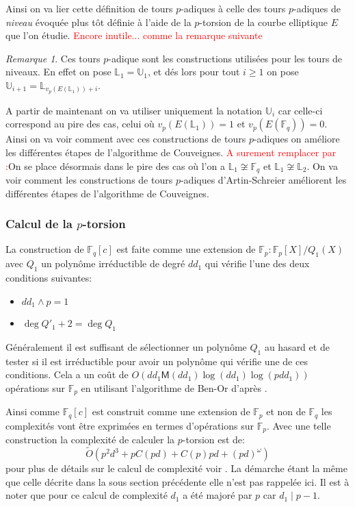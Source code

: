 \documentclass[10pt,a4paper]{book}
\theoremstyle{plain}
\theoremstyle{definition}
\theoremstyle{definition}
\theoremstyle{definition}
\theoremstyle{definition}
\theoremstyle{remark}
\newtheorem{rem}[thm]{Remarque}
\theoremstyle{remark}
\begin{document}
Ainsi on va lier cette définition de tours $p$-adiques à celle des tours $p$-adiques de \emph{niveau} évoquée plus tôt définie à l'aide de la $p$-torsion de la courbe elliptique $E$ que l'on étudie.
\textcolor{red}{Encore inutile... comme la remarque suivante}
\begin{rem}
Ces tours $p$-adique sont les constructions utilisées pour les tours de niveaux.
En effet on pose $\mathbb{L}_1=\mathbb{U}_1$, et dés lors pour tout $i\geqslant 1$ on pose $\mathbb{U}_{i+1}=\mathbb{L}_{v_p(E(\mathbb{L}_1))+i}$.
\end{rem}


A partir de maintenant on va utiliser uniquement la notation $\mathbb{U}_i$ car celle-ci correspond au pire des cas, celui où $v_p(E(\mathbb{L}_1))=1$ et $v_p(E(\mathbb{F}_q))=0$. Ainsi on va voir comment avec ces constructions de tours $p$-adiques on améliore les différentes étapes de l'algorithme de Couveignes.
\textcolor{red}{A surement remplacer par :}On se place désormais dans le pire des cas où l'on a $\mathbb{L}_1 \not \cong \mathbb{F}_q$ et $\mathbb{L}_1 \not \cong \mathbb{L}_2$. On va voir comment les constructions de tours $p$-adiques d'Artin-Schreier améliorent les différentes étapes de l'algorithme de Couveignes.
\subsubsection{Calcul de la $p$-torsion}
La construction de $\mathbb{F}_q[c]$ est faite comme une extension de $\mathbb{F}_p:\mathbb{F}_p[X]/Q_1(X)$ avec $Q_1$ un polynôme irréductible de degré $dd_1$ qui vérifie l'une des deux conditions suivantes:
\begin{itemize}
\item $d d_1 \wedge p =1$
\item $\deg Q'_1+2 = \deg Q_1$
\end{itemize}
Généralement il est suffisant de sélectionner un polynôme $Q_1$ au hasard et de tester si il est irréductible pour avoir un polynôme qui vérifie une de ces conditions. Cela a un coût de $O(dd_1 \mathsf{M}(dd_1)\log(dd_1)\log(pdd_1))$ opérations sur $\mathbb{F}_p$ en utilisant l'algorithme de Ben-Or d'après \cite[Theoreme 14.42]{vzGJG03}.

Ainsi comme $\mathbb{F}_q[c]$ est construit comme une extension de $\mathbb{F}_p$ et non de $\mathbb{F}_q$ les complexités vont être exprimées en termes d'opérations sur $\mathbb{F}_p$. Avec une telle construction la complexité de calculer la $p$-torsion est de: 
\begin{equation*}
\tilde{O}(p^2d^3+pC(pd)+C(p)pd+(pd)^{\omega})
\end{equation*}
pour plus de détails sur le calcul de complexité voir \cite{DeFeo11}. La démarche étant la même que celle décrite dans la sous section précédente elle n'est pas rappelée ici. Il est à noter que pour ce calcul de complexité $d_1$ a été majoré par $p$ car $d_1 \mid p-1$. 
\end{document}
